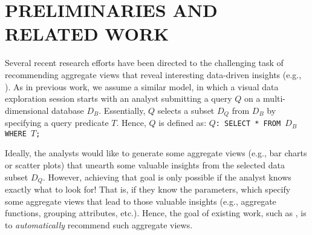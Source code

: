 
%
%
%

\section{PRELIMINARIES AND RELATED WORK}\label{sec:preliminaries_related_work}



Several recent research efforts have been directed to the challenging task of recommending aggregate views that reveal interesting data-driven insights (e.g., \cite{Vartak2014,Vartak2015,Ehsan2016}).
%
As in previous work, we assume a similar model, in which a visual data exploration session starts with an analyst submitting a query $Q$ on a multi-dimensional database $D_B$.
%
Essentially, $Q$ selects a subset $D_Q$ from $D_B$ by specifying a query predicate $T$.
%
Hence, $Q$ is  defined as:
%
{\tt $Q$: SELECT * FROM $D_B$ WHERE $T$;}



Ideally, the analysts would like to generate some aggregate views (e.g., bar charts or scatter plots) that unearth some valuable insights from the selected data subset $D_Q$. 
%
However, achieving that goal is only possible if the analyst knows exactly what to look for!  
%
That is, if they know the parameters, which specify some aggregate views that lead to those valuable insights (e.g., aggregate functions, grouping attributes, etc.). 
%
%
Hence, the goal of existing work, such as \cite{Viegas2007,Key2012,Vartak2014,Vartak2015,Ehsan2016}, is to {\em automatically} recommend such aggregate views. 
%

